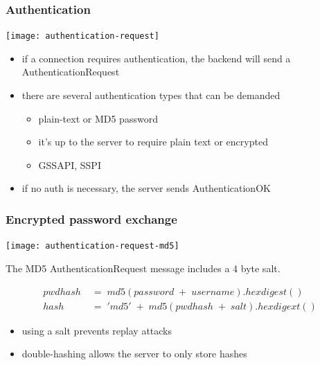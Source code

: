 \documentclass{beamer}
\begin{document}
\begin{frame}
  \frametitle{Authentication}

  \begin{center}
    \texttt{[image: authentication-request]}
  \end{center}

  \begin{itemize}
  \item if a connection requires authentication, the backend will send a
    AuthenticationRequest
  \item there are several authentication types that can be demanded
    \begin{itemize}
    \item plain-text or MD5 password
    \item it's \alert{up to the server} to require plain text or encrypted
    \item GSSAPI, SSPI
    \end{itemize}
  \item if no auth is necessary, the server sends AuthenticationOK
  \end{itemize}
\end{frame}

\begin{frame}
  \frametitle{Encrypted password exchange}

  \begin{center}
    \texttt{[image: authentication-request-md5]}
  \end{center}

  The MD5 AuthenticationRequest message includes a 4 byte salt.

  \begin{align*}
    pwdhash\;&=\;md5(password\;+\;username).hexdigest() \\
    hash\;&=\;'md5'\;+\;md5(pwdhash\;+\;salt).hexdigext()
  \end{align*}

  \begin{itemize}
  \item using a salt prevents \alert{replay attacks}
  \item double-hashing allows the server to only store \alert{hashes}
  \end{itemize}
\end{frame}
\end{document}
